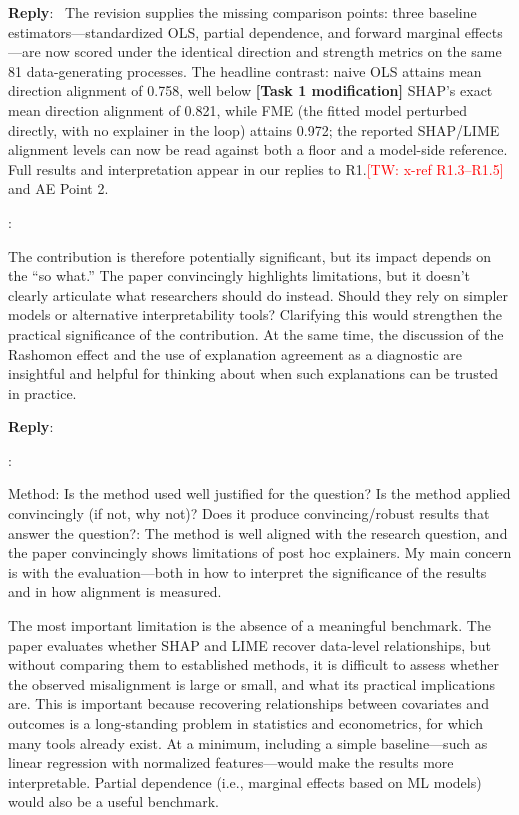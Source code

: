 \documentclass[11pt]{article}
\newcommand{\tw}[1]{\textcolor{red}{[TW: #1]}}
\newcounter{se}[section]
\newcounter{reviewer}
\newcounter{point}[reviewer]
\renewcommand{\thepoint}{R\,\thereviewer.\arabic{point}}
\newenvironment{point}{
    \refstepcounter{point} \bigskip \noindent {\textbf{\thepoint}}: \rmfamily \itshape
}{\medskip}
\newenvironment{reply}
 {\par\medskip \noindent \begin{sf}\textbf{Reply}:\ }
 {\medskip \end{sf}}
\begin{document}
\begin{reply}
{\color{red}
The revision supplies the missing comparison points: three baseline estimators---standardized OLS, partial dependence, and forward marginal effects---are now scored under the identical direction and strength metrics on the same 81 data-generating processes. The headline contrast: naive OLS attains mean direction alignment of 0.758, well below {\color{blue}\textbf{[Task 1 modification]} SHAP's exact mean direction alignment of 0.821}, while FME (the fitted model perturbed directly, with no explainer in the loop) attains 0.972; the reported SHAP/LIME alignment levels can now be read against both a floor and a model-side reference. Full results and interpretation appear in our replies to R1.\tw{x-ref R1.3--R1.5} and AE Point 2.
}
\end{reply}


\begin{point}
The contribution is therefore potentially significant, but its impact depends on the ``so what.'' The paper convincingly highlights limitations, but it doesn't clearly articulate what researchers should do instead. Should they rely on simpler models or alternative interpretability tools? Clarifying this would strengthen the practical significance of the contribution. At the same time, the discussion of the Rashomon effect and the use of explanation agreement as a diagnostic are insightful and helpful for thinking about when such explanations can be trusted in practice.
\end{point}

\begin{reply}

\end{reply}


\begin{point}
Method: Is the method used well justified for the question? Is the method applied convincingly (if not, why not)? Does it produce convincing/robust results that answer the question?: The method is well aligned with the research question, and the paper convincingly shows limitations of post hoc explainers. My main concern is with the evaluation---both in how to interpret the significance of the results and in how alignment is measured.

The most important limitation is the absence of a meaningful benchmark. The paper evaluates whether SHAP and LIME recover data-level relationships, but without comparing them to established methods, it is difficult to assess whether the observed misalignment is large or small, and what its practical implications are. This is important because recovering relationships between covariates and outcomes is a long-standing problem in statistics and econometrics, for which many tools already exist. At a minimum, including a simple baseline---such as linear regression with normalized features---would make the results more interpretable. Partial dependence (i.e., marginal effects based on ML models) would also be a useful benchmark.
\end{point}
\end{document}
